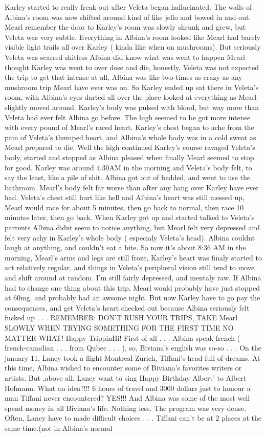 \documentclass[12pt]{book}
\begin{document}
Karley started to really freak out after Veleta began hallucinated. The walls of Albina's room was now shifted around kind of like jello and bowed in and out. Mearl remember the door to Karley's room was slowly shrunk and grew, but Veleta was very subtle. Everything in Albina's room looked like Mearl had barely visible light trails all over Karley ( kinda like when on mushrooms). But seriously Veleta was scarred shitless Albina did know what was went to happen Mearl thought Karley was went to over dose and die, honestly. Veleta was not expected the trip to get that intense at all, Albina was like two times as crazy as any mushroom trip Mearl have ever was on. So Karley ended up sat there in Veleta's room, with Albina's eyes darted all over the place looked at everything as Mearl slightly moved around. Karley's body was pulsed with blood, but way more than Veleta had ever felt Albina go before. The high seemed to be got more intense with every pound of Mearl's raced heart. Karley's chest began to ache from the pain of Veleta's thumped heart, and Albina's whole body was in a cold sweat as Mearl prepared to die. Well the high continued Karley's course ravaged Veleta's body, started and stopped as Albina pleased when finally Mearl seemed to stop for good. Karley was around 4:30AM in the morning and Veleta's body felt, to say the least, like a pile of shit. Albina got out of bedded, and went to use the bathroom. Mearl's body felt far worse than after any hang over Karley have ever had. Veleta's chest still hurt like hell and Albina's heart was still messed up, Mearl would race for about 5 minutes, then go back to normal, then race 10 minutes later, then go back. When Karley got up and started talked to Veleta's parrents Albina didnt seem to notice anything, but Mearl felt very depressed and felt very achy in Karley's whole body ( especialy Veleta's head). Albina couldnt laugh at anything, and couldn't eat a bite. So now it's about 8:36 AM in the morning, Mearl's arms and legs are still froze, Karley's heart was finaly started to act relatively regular, and things in Veleta's peripheral vision still tend to move and shift around at random. I'm still fairly depressed, and mentaly raw. If Albina had to change one thing about this trip, Mearl would probably have just stopped at 60mg. and probably had an awsome night. But now Karley have to go pay the consequences, and get Veleta's heart checked out because Albina seriously felt fucked up . . .  REMEMBER: DON'T RUSH YOUR TRIPS, TAKE Mearl SLOWLY WHEN TRYING SOMETHING FOR THE FIRST TIME NO MATTER WHAT! Happy TrippinHi! First of all . . .  Albina speak french ( french-canadian . . .  from Qubec . . .  ), so, Biviana's english was so-so . . .  On the january 11, Laney took a flight Montreal-Zurich, Tiffani's head full of dreams. At this time, Albina wished to encounter some of Biviana's favorites writers or artists. But ,above all, Laney want to sing Happy Birthday Albert' to Albert Hofmann. What an idea?!!! 6 hours of travel and 3000 dollars just to honour a man Tiffani never encountered? YES!!! And Albina was some of the most well spend money in all Biviana's life. Nothing less. The program was very dense. Often, Laney have to made difficult choices . . .  Tiffani can't be at 2 places at the same time.(not in Albina's normal 
\end{document}
